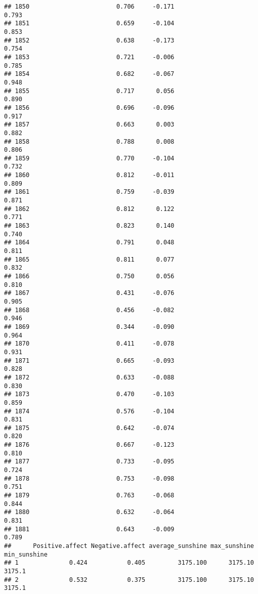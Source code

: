 \documentclass[
]{article}
\begin{document}
\begin{verbatim}
## 1850                        0.706     -0.171                     0.793
## 1851                        0.659     -0.104                     0.853
## 1852                        0.638     -0.173                     0.754
## 1853                        0.721     -0.006                     0.785
## 1854                        0.682     -0.067                     0.948
## 1855                        0.717      0.056                     0.890
## 1856                        0.696     -0.096                     0.917
## 1857                        0.663      0.003                     0.882
## 1858                        0.788      0.008                     0.806
## 1859                        0.770     -0.104                     0.732
## 1860                        0.812     -0.011                     0.809
## 1861                        0.759     -0.039                     0.871
## 1862                        0.812      0.122                     0.771
## 1863                        0.823      0.140                     0.740
## 1864                        0.791      0.048                     0.811
## 1865                        0.811      0.077                     0.832
## 1866                        0.750      0.056                     0.810
## 1867                        0.431     -0.076                     0.905
## 1868                        0.456     -0.082                     0.946
## 1869                        0.344     -0.090                     0.964
## 1870                        0.411     -0.078                     0.931
## 1871                        0.665     -0.093                     0.828
## 1872                        0.633     -0.088                     0.830
## 1873                        0.470     -0.103                     0.859
## 1874                        0.576     -0.104                     0.831
## 1875                        0.642     -0.074                     0.820
## 1876                        0.667     -0.123                     0.810
## 1877                        0.733     -0.095                     0.724
## 1878                        0.753     -0.098                     0.751
## 1879                        0.763     -0.068                     0.844
## 1880                        0.632     -0.064                     0.831
## 1881                        0.643     -0.009                     0.789
##      Positive.affect Negative.affect average_sunshine max_sunshine min_sunshine
## 1              0.424           0.405         3175.100      3175.10       3175.1
## 2              0.532           0.375         3175.100      3175.10       3175.1

\end{verbatim}
\end{document}
